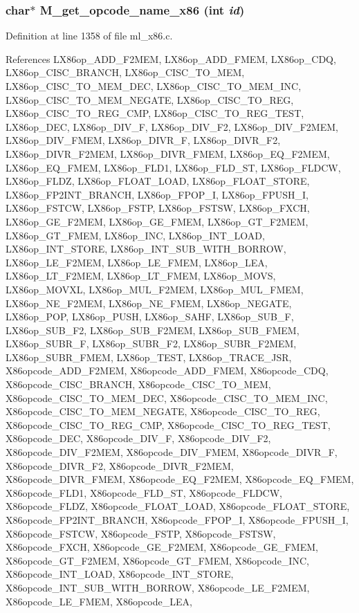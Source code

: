 \subsubsection{\setlength{\rightskip}{0pt plus 5cm}char$\ast$ M\_\-get\_\-opcode\_\-name\_\-x86 (int {\em id})}\label{ml__x86_8c_f32831336bc4aefba4a652dd24697899}




Definition at line 1358 of file ml\_\-x86.c.

References LX86op\_\-ADD\_\-F2MEM, LX86op\_\-ADD\_\-FMEM, LX86op\_\-CDQ, LX86op\_\-CISC\_\-BRANCH, LX86op\_\-CISC\_\-TO\_\-MEM, LX86op\_\-CISC\_\-TO\_\-MEM\_\-DEC, LX86op\_\-CISC\_\-TO\_\-MEM\_\-INC, LX86op\_\-CISC\_\-TO\_\-MEM\_\-NEGATE, LX86op\_\-CISC\_\-TO\_\-REG, LX86op\_\-CISC\_\-TO\_\-REG\_\-CMP, LX86op\_\-CISC\_\-TO\_\-REG\_\-TEST, LX86op\_\-DEC, LX86op\_\-DIV\_\-F, LX86op\_\-DIV\_\-F2, LX86op\_\-DIV\_\-F2MEM, LX86op\_\-DIV\_\-FMEM, LX86op\_\-DIVR\_\-F, LX86op\_\-DIVR\_\-F2, LX86op\_\-DIVR\_\-F2MEM, LX86op\_\-DIVR\_\-FMEM, LX86op\_\-EQ\_\-F2MEM, LX86op\_\-EQ\_\-FMEM, LX86op\_\-FLD1, LX86op\_\-FLD\_\-ST, LX86op\_\-FLDCW, LX86op\_\-FLDZ, LX86op\_\-FLOAT\_\-LOAD, LX86op\_\-FLOAT\_\-STORE, LX86op\_\-FP2INT\_\-BRANCH, LX86op\_\-FPOP\_\-I, LX86op\_\-FPUSH\_\-I, LX86op\_\-FSTCW, LX86op\_\-FSTP, LX86op\_\-FSTSW, LX86op\_\-FXCH, LX86op\_\-GE\_\-F2MEM, LX86op\_\-GE\_\-FMEM, LX86op\_\-GT\_\-F2MEM, LX86op\_\-GT\_\-FMEM, LX86op\_\-INC, LX86op\_\-INT\_\-LOAD, LX86op\_\-INT\_\-STORE, LX86op\_\-INT\_\-SUB\_\-WITH\_\-BORROW, LX86op\_\-LE\_\-F2MEM, LX86op\_\-LE\_\-FMEM, LX86op\_\-LEA, LX86op\_\-LT\_\-F2MEM, LX86op\_\-LT\_\-FMEM, LX86op\_\-MOVS, LX86op\_\-MOVXL, LX86op\_\-MUL\_\-F2MEM, LX86op\_\-MUL\_\-FMEM, LX86op\_\-NE\_\-F2MEM, LX86op\_\-NE\_\-FMEM, LX86op\_\-NEGATE, LX86op\_\-POP, LX86op\_\-PUSH, LX86op\_\-SAHF, LX86op\_\-SUB\_\-F, LX86op\_\-SUB\_\-F2, LX86op\_\-SUB\_\-F2MEM, LX86op\_\-SUB\_\-FMEM, LX86op\_\-SUBR\_\-F, LX86op\_\-SUBR\_\-F2, LX86op\_\-SUBR\_\-F2MEM, LX86op\_\-SUBR\_\-FMEM, LX86op\_\-TEST, LX86op\_\-TRACE\_\-JSR, X86opcode\_\-ADD\_\-F2MEM, X86opcode\_\-ADD\_\-FMEM, X86opcode\_\-CDQ, X86opcode\_\-CISC\_\-BRANCH, X86opcode\_\-CISC\_\-TO\_\-MEM, X86opcode\_\-CISC\_\-TO\_\-MEM\_\-DEC, X86opcode\_\-CISC\_\-TO\_\-MEM\_\-INC, X86opcode\_\-CISC\_\-TO\_\-MEM\_\-NEGATE, X86opcode\_\-CISC\_\-TO\_\-REG, X86opcode\_\-CISC\_\-TO\_\-REG\_\-CMP, X86opcode\_\-CISC\_\-TO\_\-REG\_\-TEST, X86opcode\_\-DEC, X86opcode\_\-DIV\_\-F, X86opcode\_\-DIV\_\-F2, X86opcode\_\-DIV\_\-F2MEM, X86opcode\_\-DIV\_\-FMEM, X86opcode\_\-DIVR\_\-F, X86opcode\_\-DIVR\_\-F2, X86opcode\_\-DIVR\_\-F2MEM, X86opcode\_\-DIVR\_\-FMEM, X86opcode\_\-EQ\_\-F2MEM, X86opcode\_\-EQ\_\-FMEM, X86opcode\_\-FLD1, X86opcode\_\-FLD\_\-ST, X86opcode\_\-FLDCW, X86opcode\_\-FLDZ, X86opcode\_\-FLOAT\_\-LOAD, X86opcode\_\-FLOAT\_\-STORE, X86opcode\_\-FP2INT\_\-BRANCH, X86opcode\_\-FPOP\_\-I, X86opcode\_\-FPUSH\_\-I, X86opcode\_\-FSTCW, X86opcode\_\-FSTP, X86opcode\_\-FSTSW, X86opcode\_\-FXCH, X86opcode\_\-GE\_\-F2MEM, X86opcode\_\-GE\_\-FMEM, X86opcode\_\-GT\_\-F2MEM, X86opcode\_\-GT\_\-FMEM, X86opcode\_\-INC, X86opcode\_\-INT\_\-LOAD, X86opcode\_\-INT\_\-STORE, X86opcode\_\-INT\_\-SUB\_\-WITH\_\-BORROW, X86opcode\_\-LE\_\-F2MEM, X86opcode\_\-LE\_\-FMEM, X86opcode\_\-LEA, 